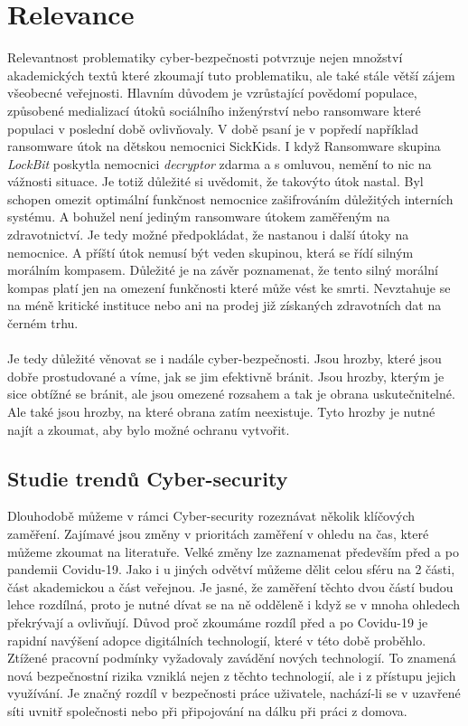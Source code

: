 \section{Relevance}
Relevantnost problematiky cyber-bezpečnosti potvrzuje nejen množství akademických textů které zkoumají tuto problematiku, ale také stále větší zájem všeobecné veřejnosti.
Hlavním důvodem je vzrůstající povědomí populace, způsobené medializací útoků sociálního inženýrství nebo ransomware které populaci v poslední době ovlivňovaly.
V době psaní je v popředí například ransomware útok na dětskou nemocnici SickKids.\cite{bleep_sickkids_ransom}
I když Ransomware skupina \textit{LockBit} poskytla nemocnici \textit{decryptor} zdarma a s omluvou, nemění to nic na vážnosti situace.
Je totiž důležité si uvědomit, že takovýto útok nastal.
Byl schopen omezit optimální funkčnost nemocnice zašifrováním důležitých interních systému.
A bohužel není jediným ransomware útokem zaměřeným na zdravotnictví.
Je tedy možné předpokládat, že nastanou i další útoky na nemocnice.
A příští útok nemusí být veden skupinou, která se řídí silným morálním kompasem.
Důležité je na závěr poznamenat, že tento silný morální kompas platí jen na omezení funkčnosti které může vést ke smrti.
Nevztahuje se na méně kritické instituce nebo ani na prodej již získaných zdravotních dat na černém trhu.

\paragraph{}
Je tedy důležité věnovat se i nadále cyber-bezpečnosti.
Jsou hrozby, které jsou dobře prostudované a víme, jak se jim efektivně bránit.
Jsou hrozby, kterým je sice obtížné se bránit, ale jsou omezené rozsahem a tak je obrana uskutečnitelné.
Ale také jsou hrozby, na které obrana zatím neexistuje.
Tyto hrozby je nutné najít a zkoumat, aby bylo možné ochranu vytvořit.

\subsection{Studie trendů Cyber-security}
Dlouhodobě můžeme v rámci Cyber-security rozeznávat několik klíčových zaměření.
Zajímavé jsou změny v prioritách zaměření v ohledu na čas, které můžeme zkoumat na literatuře.
Velké změny lze zaznamenat především před a po pandemii Covidu-19.\cite{KUMAR2022102821}
Jako i u jiných odvětví můžeme dělit celou sféru na 2 části, část akademickou a část veřejnou.
Je jasné, že zaměření těchto dvou částí budou lehce rozdílná, proto je nutné dívat se na ně odděleně i když se v mnoha ohledech překrývají a ovlivňují.
Důvod proč zkoumáme rozdíl před a po Covidu-19 je rapidní navýšení adopce digitálních technologií, které v této době proběhlo.
Ztížené pracovní podmínky vyžadovaly zavádění nových technologií.
To znamená nová bezpečnostní rizika vzniklá nejen z těchto technologií, ale i z přístupu jejich využívání.
Je značný rozdíl v bezpečnosti práce uživatele, nachází-li se v uzavřené síti uvnitř společnosti nebo při připojování na dálku při práci z domova.

